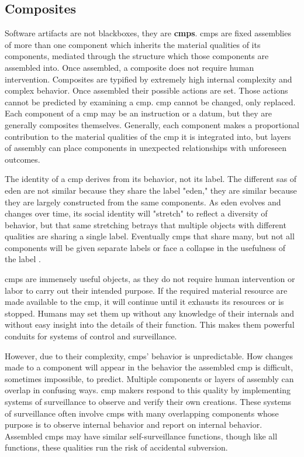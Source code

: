 \documentclass[a4paper,man,natbib,floatsintext]{apa6}
\begin{document}
  \subsection{Composites}
  Software artifacts are not blackboxes, they are \textbf{\glspl{cmp}}. \Glspl{cmp} are fixed assemblies of more than one component which inherits the material qualities of its components, mediated through the structure which those components are assembled into. Once assembled, a composite does not require human intervention. Composites are typified by extremely high internal complexity and complex behavior. Once assembled their possible actions are set. Those actions cannot be predicted by examining a \gls{cmp}. \Gls{cmp} cannot be changed, only replaced. Each component of a \gls{cmp} may be an instruction or a datum, but they are generally composites themselves. Generally, each component makes a proportional contribution to the material qualities of the \gls{cmp} it is integrated into, but layers of assembly can place components in unexpected relationships with unforeseen outcomes.

  The identity of a \gls{cmp} derives from its behavior, not its label. The different \glspl{sa} of \acrshort{eden} are not similar because they share the label "eden," they are similar because they are largely constructed from the same components. As \acrshort{eden} evolves and changes over time, its social identity will "stretch" to reflect a diversity of behavior, but that same stretching betrays that multiple objects with different qualities are sharing a single label. Eventually \glspl{cmp} that share many, but not all components will be given separate labels or face a collapse in the usefulness of the label \citet{Bivens2017-tc}. 

  \Glspl{cmp} are immensely useful objects, as they do not require human intervention or labor to carry out their intended purpose. If the required material resource are made available to the \gls{cmp}, it will continue until it exhausts its resources or is stopped. Humans may set them up without any knowledge of their internals and without easy insight into the details of their function. This makes them powerful conduits for systems of control and surveillance. 

  However, due to their complexity, \glspl{cmp}' behavior is unpredictable. How changes made to a component will appear in the behavior the assembled \gls{cmp} is difficult, sometimes impossible, to predict. Multiple components or layers of assembly can overlap in confusing ways\footnotemark. \Gls{cmp} makers respond to this quality by implementing systems of surveillance to observe and verify their own creations. These systems of surveillance often involve \glspl{cmp} with many overlapping components whose purpose is to observe internal behavior and report on internal behavior. Assembled \glspl{cmp} may have similar self-surveillance functions, though like all functions, these qualities run the risk of accidental subversion.
\end{document}

